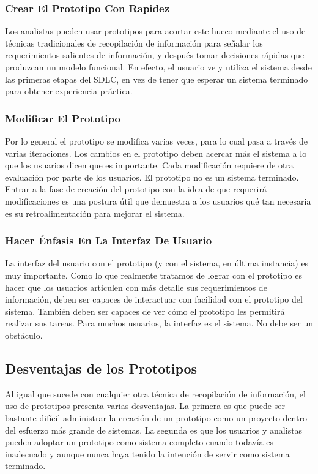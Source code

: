 \subsubsection{Crear El Prototipo Con Rapidez }
Los analistas pueden usar prototipos para acortar este hueco mediante el uso de técnicas tradicionales de recopilación de información para señalar los requerimientos salientes de información, y después tomar decisiones rápidas que produzcan un modelo funcional. En efecto, el usuario ve y utiliza el sistema desde las primeras etapas del SDLC, en vez de tener que esperar un sistema terminado para obtener experiencia práctica.
    
\subsubsection{Modificar El Prototipo }
Por lo general el prototipo se modifica varias veces, para lo cual pasa a través de varias iteraciones. Los cambios en el prototipo deben acercar más el sistema a lo que los usuarios dicen que es importante. Cada modificación requiere de otra evaluación por parte de los usuarios. El prototipo no es un sistema terminado. Entrar a la fase de creación del prototipo con la idea de que requerirá modificaciones es una postura útil que demuestra a los usuarios qué tan necesaria es su retroalimentación para mejorar el sistema. 

\subsubsection{Hacer Énfasis En La Interfaz De Usuario }
La interfaz del usuario con el prototipo (y con el sistema, en última instancia) es muy importante. Como lo que realmente tratamos de lograr con el prototipo es hacer que los usuarios articulen con más detalle sus requerimientos de información, deben ser capaces de interactuar con facilidad con el prototipo del sistema. También deben ser capaces de ver cómo el prototipo les permitirá realizar sus tareas. Para muchos usuarios, la interfaz es el sistema. No debe ser un obstáculo.

\subsection{Desventajas de los Prototipos }
Al igual que sucede con cualquier otra técnica de recopilación de información, el uso de prototipos presenta varias desventajas. 
La primera es que puede ser bastante difícil administrar la creación de un prototipo como un proyecto dentro del esfuerzo más grande de sistemas.
La segunda es que los usuarios y analistas pueden adoptar un prototipo como sistema completo cuando todavía es inadecuado y aunque nunca haya tenido la intención de servir como sistema terminado. 

